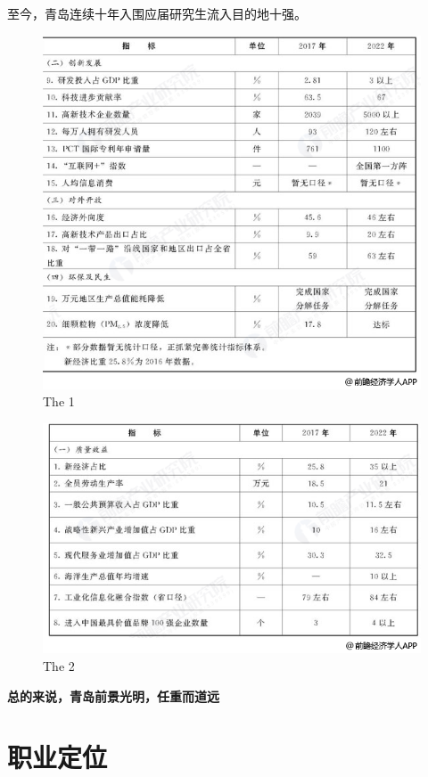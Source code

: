 \documentclass{article}
\begin{document}
至今，青岛连续十年入围应届研究生流入目的地十强。
\begin{figure}[h!]
	\centering
	\includegraphics[scale=0.5]{1}
	\caption{The 1}
	\label{fig:1}
\end{figure}
\begin{figure}[h!]
	\centering
	\includegraphics[scale=0.6]{2}
	\caption{The 2}
	\label{fig:2}
\end{figure}
\par
{\bf 总的来说，青岛前景光明，任重而道远}\par
\section{职业定位}
\end{document}
